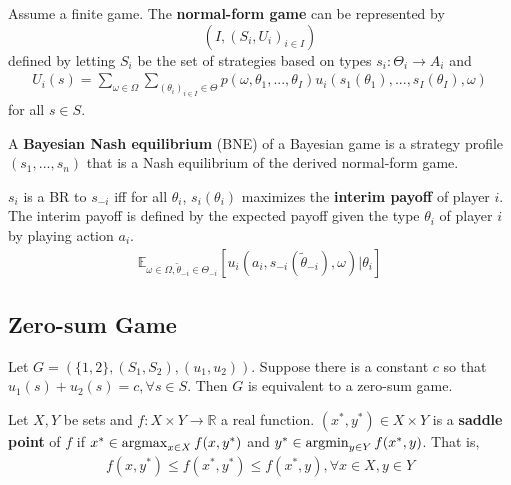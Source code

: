 \documentclass[11pt]{elegantbook_2}
\newcommand{\argmax}{\operatornamewithlimits{argmax}}
\newcommand{\argmin}{\operatornamewithlimits{argmin}}
\begin{document}
\begin{definition}
    Assume a finite game. The \textbf{normal-form game} can be represented by $$\left(I,(S_i,U_i)_{i\in I}\right)$$ defined by letting $S_i$ be the set of strategies based on types $s_i:\Theta_i \rightarrow A_i$ and
    \begin{equation}
        \begin{aligned}
            U_i(s)=\sum_{\omega\in\Omega}\sum_{(\theta_i)_{i\in I}\in \Theta}p(\omega,\theta_1,...,\theta_I)u_i(s_1(\theta_1),..., s_I(\theta_I),\omega)
        \end{aligned}
        \nonumber
    \end{equation}
    for all $s\in S$.

    A \textbf{Bayesian Nash equilibrium} (BNE) of a Bayesian game is a strategy profile $(s_1,...,s_n)$ that is a Nash equilibrium of the derived normal-form game.
\end{definition}

\begin{definition}
    $s_i$ is a BR to $s_{-i}$ iff for all $\theta_i$, $s_i(\theta_i)$ maximizes the \textbf{interim payoff} of player $i$. The interim payoff is defined by the expected payoff given the type $\theta_i$ of player $i$ by playing action $a_i$.
    \begin{equation}
        \begin{aligned}
            \mathbb{E}_{\omega\in\Omega,\tilde{\theta}_{-i}\in\Theta_{-i}}[u_i(a_i,s_{-i}(\tilde{\theta}_{-i}),\omega)|\theta_i]
        \end{aligned}
        \nonumber
    \end{equation}
\end{definition}

\subsection{Zero-sum Game}
Let $G=(\{1,2\},(S_1,S_2),(u_1,u_2))$. Suppose there is a constant $c$ so that $u_1(s)+u_2(s)=c, \forall s\in S$. Then $G$ is equivalent to a zero-sum game.

\begin{definition}
    Let $X,Y$ be sets and $f:X\times Y \rightarrow \mathbb{R}$ a real function. $(x^*,y^*)\in X\times Y$ is a \textbf{saddle point} of $f$ if $x^*\in\argmax_{x\in X}f(x,y^*)$ and $y^*\in\argmin_{y\in Y}f(x^*,y)$. That is,
    \begin{equation}
        \begin{aligned}
            f(x,y^*)\leq f(x^*,y^*)\leq f(x^*,y),\forall x\in X,y\in Y
        \end{aligned}
        \nonumber
    \end{equation}
\end{definition}
\end{document}
